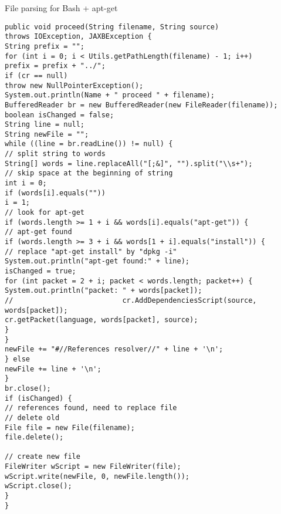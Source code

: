 \begin{Listing}
\caption{File parsing for Bash + apt-get }
\label{lst:bash_apt_parse}
\begin{lstlisting}
public void proceed(String filename, String source)
throws IOException, JAXBException {
String prefix = "";
for (int i = 0; i < Utils.getPathLength(filename) - 1; i++)
prefix = prefix + "../";
if (cr == null)
throw new NullPointerException();
System.out.println(Name + " proceed " + filename);
BufferedReader br = new BufferedReader(new FileReader(filename));
boolean isChanged = false;
String line = null;
String newFile = "";
while ((line = br.readLine()) != null) {
// split string to words
String[] words = line.replaceAll("[;&]", "").split("\\s+");
// skip space at the beginning of string
int i = 0;
if (words[i].equals(""))
i = 1;
// look for apt-get
if (words.length >= 1 + i && words[i].equals("apt-get")) {
// apt-get found
if (words.length >= 3 + i && words[1 + i].equals("install")) {
// replace "apt-get install" by "dpkg -i"
System.out.println("apt-get found:" + line);
isChanged = true;
for (int packet = 2 + i; packet < words.length; packet++) {
System.out.println("packet: " + words[packet]);
//							cr.AddDependenciesScript(source, words[packet]);
cr.getPacket(language, words[packet], source);
}
}
newFile += "#//References resolver//" + line + '\n';
} else
newFile += line + '\n';
}
br.close();
if (isChanged) {
// references found, need to replace file
// delete old
File file = new File(filename);
file.delete();

// create new file
FileWriter wScript = new FileWriter(file);
wScript.write(newFile, 0, newFile.length());
wScript.close();
}
}
\end{lstlisting}
\end{Listing}

